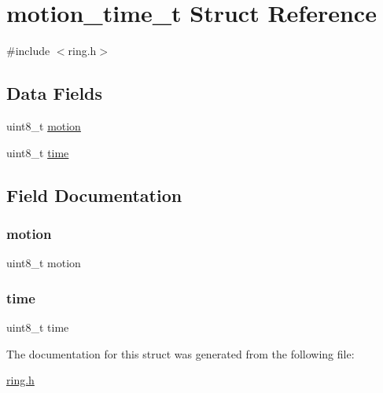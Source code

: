\hypertarget{structmotion__time__t}{}\section{motion\+\_\+time\+\_\+t Struct Reference}
\label{structmotion__time__t}


{\ttfamily \#include $<$ring.\+h$>$}

\subsection*{Data Fields}
\begin{DoxyCompactItemize}
\item 
uint8\+\_\+t \hyperlink{structmotion__time__t_af5cce4e990612a7df34e50eab7a2e587}{motion}
\item 
uint8\+\_\+t \hyperlink{structmotion__time__t_a3b4bcf3c4c4d82f8d051e3d08a4c40a3}{time}
\end{DoxyCompactItemize}


\subsection{Field Documentation}
\mbox{\label{structmotion__time__t_af5cce4e990612a7df34e50eab7a2e587}} 
\subsubsection{\texorpdfstring{motion}{motion}}
{\footnotesize\ttfamily uint8\+\_\+t motion}

\mbox{\label{structmotion__time__t_a3b4bcf3c4c4d82f8d051e3d08a4c40a3}} 
\subsubsection{\texorpdfstring{time}{time}}
{\footnotesize\ttfamily uint8\+\_\+t time}



The documentation for this struct was generated from the following file\+:\begin{DoxyCompactItemize}
\item 
\hyperlink{ring_8h}{ring.\+h}\end{DoxyCompactItemize}
